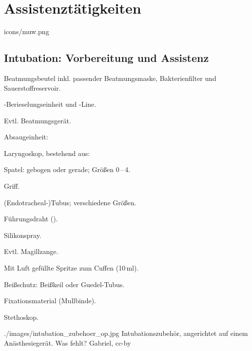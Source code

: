 \section{Assistenztätigkeiten}

{icons/muw.png}
{}
{}





\subsection{Intubation: Vorbereitung und Assistenz}
\label{topic:intubation-assistenz}


{
\begin{compactenum}
    \item Beatmungsbeutel inkl. passender Beatmungsmaske, Bakterienfilter und
    Sauerstoffreservoir.
    \item {}-Berieselungseinheit und -Line.
    \item Evtl. Beatmungsgerät.
    \item Absaugeinheit: \par{}
    \item Laryngoskop, bestehend aus:
    \begin{compactenum}
        \item Spatel: gebogen oder gerade; Größen 0\,--\,4.
        \item Griff.
    \end{compactenum}
    \item (Endotracheal-)Tubus; verschiedene Größen.
    \item Führungsdraht ().
    \item Silikonspray.
    \item Evtl. Magillzange.
    \item Mit Luft gefüllte Spritze zum Cuffen (10\,ml).
    \item Beißschutz: Beißkeil oder Guedel-Tubus.
    \item Fixationsmaterial (Mullbinde).
    \item Stethoskop.
\end{compactenum}
}
{}
{./images/intubation_zubehoer_op.jpg}
{Intubationszubehör, angerichtet auf
einem Anästhesiegerät. Was fehlt? %
}
{Gabriel, cc-by}

